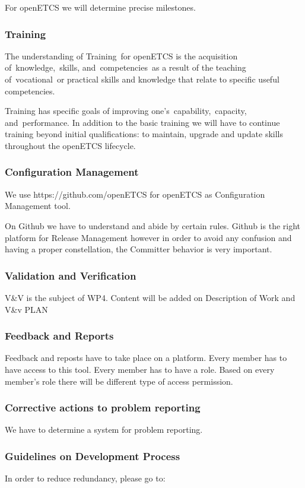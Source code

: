 \documentclass{template/openetcs_article}
\begin{document}
For openETCS we will determine precise milestones.


\subsubsection{Training}
The understanding of Training~for openETCS is the acquisition of~knowledge,~skills, and~competencies~as a result of the teaching of~vocational~or practical skills and knowledge that relate to specific useful competencies. 

Training has specific goals of improving  one's~capability,~capacity, and~performance. In addition to the basic training we will have to continue training beyond initial qualifications: to maintain, upgrade and update skills throughout the openETCS lifecycle.


\subsubsection{Configuration Management}
We use https://github.com/openETCS for openETCS as Configuration Management tool.

On Github we have to understand and abide by certain rules. Github is the right platform for Release Management however in order to avoid any confusion and having a proper constellation, the Committer behavior is  very important.


\subsubsection{Validation and Verification}
V\&V is the subject of WP4.
Content will be added on Description of Work and V\&v PLAN



\subsubsection{Feedback and Reports}
Feedback and reposts have to take place on a platform. Every member has to have access to this tool. Every member has to have a role. Based on every member's role there will be different type of access permission.


\subsubsection{Corrective actions to problem reporting}
We have to determine a system for problem reporting.


\subsubsection{Guidelines on Development Process}
In order to reduce redundancy, please go to:
\end{document}
